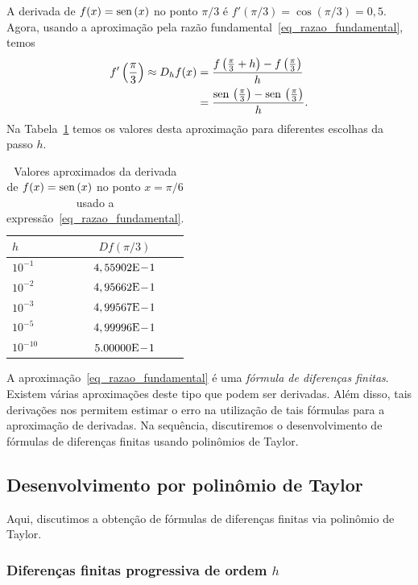 \begin{ex}\label{ex_intro_deriv}
  A derivada de $f(x) = \operatorname{sen}\,(x)$ no ponto $\pi/3$ é $f'(\pi/3) = \cos(\pi/3)=0,5$. Agora, usando a aproximação pela razão fundamental~\eqref{eq_razao_fundamental}, temos
  \begin{align}
    f'\left(\frac{\pi}{3}\right) \approx D_hf(x) &= \frac{f\left(\frac{\pi}{3}+h\right)-f\left(\frac{\pi}{3}\right)}{h}\\
          &= \frac{\operatorname{sen}\,\left(\frac{\pi}{3}\right)-\operatorname{sen}\,\left(\frac{\pi}{3}\right)}{h}. 
  \end{align}
Na Tabela~\ref{tab:ex_intro_deriv} temos os valores desta aproximação para diferentes escolhas da passo $h$.

\begin{table}[hp]
  \centering
  \begin{tabular}{l|c}
    $h$ & $Df(\pi/3)$ \\ \hline
    $10^{-1}$ & $4,55902\mathrm{E}\!-\!1$ \\
    $10^{-2}$ & $4,95662\mathrm{E}\!-\!1$ \\
    $10^{-3}$ & $4,99567\mathrm{E}\!-\!1$ \\
    $10^{-5}$ & $4,99996\mathrm{E}\!-\!1$ \\
    $10^{-10}$ & $5.00000\mathrm{E}\!-\!1$ \\\hline
  \end{tabular}
  \caption{Valores aproximados da derivada de $f(x)=\operatorname{sen}\,(x)$ no ponto $x=\pi/6$ usado a expressão~\eqref{eq_razao_fundamental}.}
  \label{tab:ex_intro_deriv}
\end{table}
\end{ex}

A aproximação~\eqref{eq_razao_fundamental} é uma \emph{fórmula de diferenças finitas}. Existem várias aproximações deste tipo que podem ser derivadas. Além disso, tais derivações nos permitem estimar o erro na utilização de tais fórmulas para a aproximação de derivadas. Na sequência, discutiremos o desenvolvimento de fórmulas de diferenças finitas usando polinômios de Taylor.

\subsection{Desenvolvimento por polinômio de Taylor}

Aqui, discutimos a obtenção de fórmulas de diferenças finitas via polinômio de Taylor.

\subsubsection{Diferenças finitas progressiva de ordem $h$}

